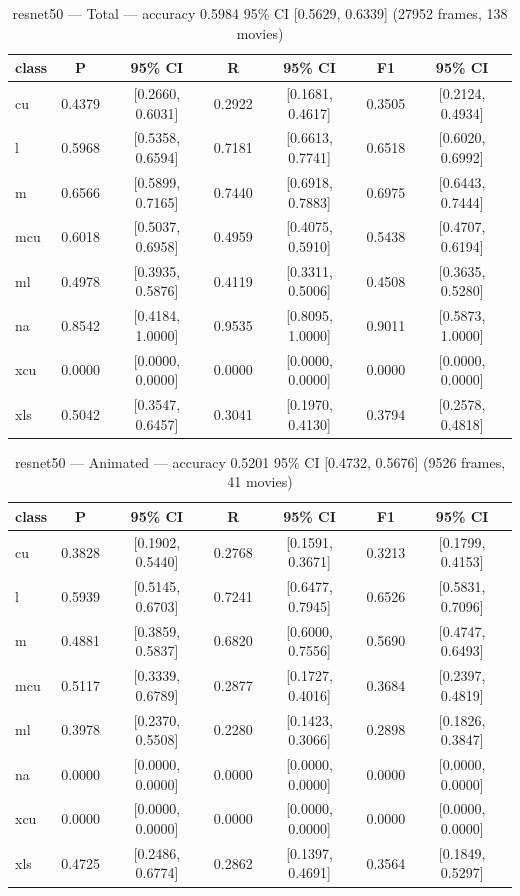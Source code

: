 \begin{table}[htbp]
\centering
\caption{resnet50 — Total — accuracy 0.5984 95\% CI [0.5629, 0.6339] (27952 frames, 138 movies)}
\label{tab:resnet50-total}
\begin{tabular}{lcccccc}
\toprule
class & P & 95\% CI & R & 95\% CI & F1 & 95\% CI \\
\midrule
cu & 0.4379 & [0.2660, 0.6031] & 0.2922 & [0.1681, 0.4617] & 0.3505 & [0.2124, 0.4934] \\
l & 0.5968 & [0.5358, 0.6594] & 0.7181 & [0.6613, 0.7741] & 0.6518 & [0.6020, 0.6992] \\
m & 0.6566 & [0.5899, 0.7165] & 0.7440 & [0.6918, 0.7883] & 0.6975 & [0.6443, 0.7444] \\
mcu & 0.6018 & [0.5037, 0.6958] & 0.4959 & [0.4075, 0.5910] & 0.5438 & [0.4707, 0.6194] \\
ml & 0.4978 & [0.3935, 0.5876] & 0.4119 & [0.3311, 0.5006] & 0.4508 & [0.3635, 0.5280] \\
na & 0.8542 & [0.4184, 1.0000] & 0.9535 & [0.8095, 1.0000] & 0.9011 & [0.5873, 1.0000] \\
xcu & 0.0000 & [0.0000, 0.0000] & 0.0000 & [0.0000, 0.0000] & 0.0000 & [0.0000, 0.0000] \\
xls & 0.5042 & [0.3547, 0.6457] & 0.3041 & [0.1970, 0.4130] & 0.3794 & [0.2578, 0.4818] \\
\bottomrule
\end{tabular}
\end{table}

\begin{table}[htbp]
\centering
\caption{resnet50 — Animated — accuracy 0.5201 95\% CI [0.4732, 0.5676] (9526 frames, 41 movies)}
\label{tab:resnet50-animated}
\begin{tabular}{lcccccc}
\toprule
class & P & 95\% CI & R & 95\% CI & F1 & 95\% CI \\
\midrule
cu & 0.3828 & [0.1902, 0.5440] & 0.2768 & [0.1591, 0.3671] & 0.3213 & [0.1799, 0.4153] \\
l & 0.5939 & [0.5145, 0.6703] & 0.7241 & [0.6477, 0.7945] & 0.6526 & [0.5831, 0.7096] \\
m & 0.4881 & [0.3859, 0.5837] & 0.6820 & [0.6000, 0.7556] & 0.5690 & [0.4747, 0.6493] \\
mcu & 0.5117 & [0.3339, 0.6789] & 0.2877 & [0.1727, 0.4016] & 0.3684 & [0.2397, 0.4819] \\
ml & 0.3978 & [0.2370, 0.5508] & 0.2280 & [0.1423, 0.3066] & 0.2898 & [0.1826, 0.3847] \\
na & 0.0000 & [0.0000, 0.0000] & 0.0000 & [0.0000, 0.0000] & 0.0000 & [0.0000, 0.0000] \\
xcu & 0.0000 & [0.0000, 0.0000] & 0.0000 & [0.0000, 0.0000] & 0.0000 & [0.0000, 0.0000] \\
xls & 0.4725 & [0.2486, 0.6774] & 0.2862 & [0.1397, 0.4691] & 0.3564 & [0.1849, 0.5297] \\
\bottomrule
\end{tabular}
\end{table}

